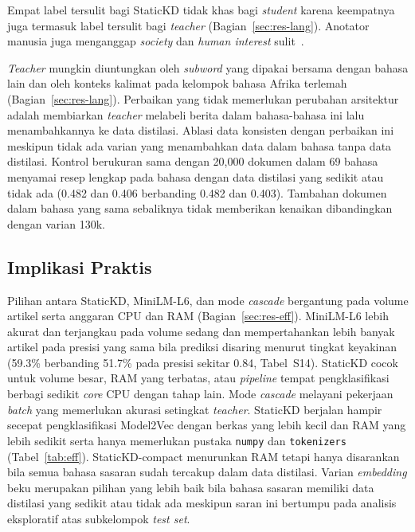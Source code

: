 \documentclass{ieeeaccess}
\newcommand{\en}[1]{\textit{#1}}
\begin{document}
Empat label tersulit bagi StaticKD tidak khas bagi \en{student} karena keempatnya juga termasuk label tersulit bagi \en{teacher} (Bagian~\ref{sec:res-lang}). Anotator manusia juga menganggap \emph{society} dan \emph{human interest} sulit~\cite{kuzman2025llm}.

\en{Teacher} mungkin diuntungkan oleh \en{subword} yang dipakai bersama dengan bahasa lain dan oleh konteks kalimat pada kelompok bahasa Afrika terlemah (Bagian~\ref{sec:res-lang}). Perbaikan yang tidak memerlukan perubahan arsitektur adalah membiarkan \en{teacher} melabeli berita dalam bahasa-bahasa ini lalu menambahkannya ke data distilasi. Ablasi data konsisten dengan perbaikan ini meskipun tidak ada varian yang menambahkan data dalam bahasa tanpa data distilasi. Kontrol berukuran sama dengan 20,000 dokumen dalam 69 bahasa menyamai resep lengkap pada bahasa dengan data distilasi yang sedikit atau tidak ada (0.482 dan 0.406 berbanding 0.482 dan 0.403). Tambahan dokumen dalam bahasa yang sama sebaliknya tidak memberikan kenaikan dibandingkan dengan varian 130k.

\subsection{Implikasi Praktis}
Pilihan antara StaticKD, MiniLM-L6, dan mode \en{cascade} bergantung pada volume artikel serta anggaran CPU dan RAM (Bagian~\ref{sec:res-eff}). MiniLM-L6 lebih akurat dan terjangkau pada volume sedang dan mempertahankan lebih banyak artikel pada presisi yang sama bila prediksi disaring menurut tingkat keyakinan (59.3\% berbanding 51.7\% pada presisi sekitar 0.84, Tabel~S14). StaticKD cocok untuk volume besar, RAM yang terbatas, atau \en{pipeline} tempat pengklasifikasi berbagi sedikit \en{core} CPU dengan tahap lain. Mode \en{cascade} melayani pekerjaan \en{batch} yang memerlukan akurasi setingkat \en{teacher}. StaticKD berjalan hampir secepat pengklasifikasi Model2Vec dengan berkas yang lebih kecil dan RAM yang lebih sedikit serta hanya memerlukan pustaka \texttt{numpy} dan \texttt{tokenizers} (Tabel~\ref{tab:eff}). StaticKD-compact menurunkan RAM tetapi hanya disarankan bila semua bahasa sasaran sudah tercakup dalam data distilasi. Varian \en{embedding} beku merupakan pilihan yang lebih baik bila bahasa sasaran memiliki data distilasi yang sedikit atau tidak ada meskipun saran ini bertumpu pada analisis eksploratif atas subkelompok \en{test set}.
\end{document}
